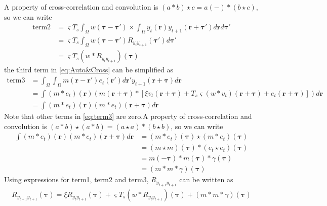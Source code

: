\documentclass[]{article}
\begin{document}
A property of cross-correlation and convolution is $(a \ast b) \star c = a(-)\ast(b \star c)$, so we can write
\begin{align}
	\text{term2}&= \varsigma T_s \int_{\Omega} w(\boldsymbol{\tau}-\boldsymbol{\tau}') 
	\times \int_{\Omega} y_t(\mathbf{r}) y_{t+1}(\mathbf{r}+\boldsymbol{\tau}') d\mathbf{r}d\boldsymbol{\tau}' \nonumber \\
	&= \varsigma T_s \int_{\Omega} w(\boldsymbol{\tau}-\boldsymbol{\tau}') R_{y_ty_{t+1}}(\boldsymbol{\tau}')d\boldsymbol{\tau}' \nonumber \\
	&=\varsigma T_s \left(w \ast R_{y_ty_{t+1}} \right)(\boldsymbol{\tau})
\end{align}
the third term in \eqref{eq:Auto&Cross} can be simplified as
\begin{align}\label{eq:term3}
\text{term3}&=\int_{\Omega}\int_{\Omega} m(\mathbf{r}-\mathbf{r}')e_t(\mathbf{r}')d\mathbf{r}'y_{t+1}(\mathbf{r}+\boldsymbol{\tau})  d\mathbf{r} \nonumber \\
&=\int \left(m \ast e_t\right)(\mathbf r)\left(m\left(\mathbf{r}+\boldsymbol\tau\right) \ast \left[\xi v_t\left(\mathbf{r}+\boldsymbol\tau\right) + 
	T_s \varsigma \left(w \ast v_t\right)(\mathbf r + \boldsymbol \tau)
	+ e_t\left(\mathbf{r}+\boldsymbol{\tau}\right) \right] \right)d\mathbf r \nonumber \\
	&=\int\left(m \ast e_t\right)(\mathbf r)\left(m \ast e_t\right)(\mathbf r+\boldsymbol\tau)d\mathbf r
\end{align}
Note that other terms in \ref{eq:term3} are zero.A property of cross-correlation and convolution is $(a \ast b) \star (a \ast b)=(a \star a)\ast(b \star b)$, so we can write
\begin{align}
 \int\left(m \ast e_t\right)(\mathbf r)\left(m \ast e_t\right)(\mathbf r+\boldsymbol\tau)d\mathbf r&=\left(m \ast e_t\right)(\boldsymbol\tau)\star\left(m \ast e_t\right)(\boldsymbol\tau) \nonumber \\
&=\left(m \star m\right)(\boldsymbol\tau)\ast\left(e_t \star e_t\right)(\boldsymbol\tau) \nonumber\\
&=m(-\boldsymbol\tau)\ast m(\boldsymbol\tau)\ast \gamma(\boldsymbol\tau) \nonumber \\
&=(m\ast m \ast \gamma)(\boldsymbol\tau)
\end{align}
Using expressions for term1, term2 and term3, $R_{y_{t+1}y_{t+1}}$ can be written as
\begin{align}
	R_{y_{t+1}y_{t+1}}(\boldsymbol{\tau})= \xi R_{y_ty_{t+1}}(\boldsymbol{\tau})+\varsigma T_s \left(w \ast R_{y_ty_{t+1}} \right)(\boldsymbol{\tau})+(m\ast m \ast \gamma)(\boldsymbol\tau)
\end{align}
\end{document}
